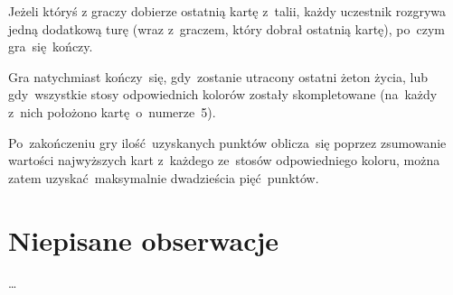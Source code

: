 \documentclass[declaration,shortabstract,inz]{iithesis}
\begin{document}
Jeżeli któryś z graczy dobierze ostatnią kartę z~talii, każdy uczestnik rozgrywa jedną dodatkową turę (wraz z~graczem, który dobrał ostatnią kartę), po~czym gra~się kończy.

Gra natychmiast kończy~się, gdy~zostanie utracony ostatni żeton życia, lub gdy~wszystkie stosy odpowiednich kolorów zostały skompletowane (na~każdy z~nich położono kartę o~numerze~5).

Po~zakończeniu gry ilość uzyskanych punktów oblicza~się poprzez zsumowanie wartości najwyższych kart z~każdego ze~stosów odpowiedniego koloru, można zatem uzyskać maksymalnie dwadzieścia pięć punktów.

\section{Niepisane obserwacje}

\ldots


\end{document}
